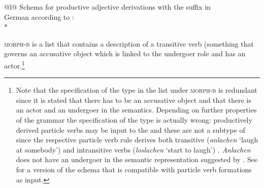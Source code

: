\documentclass[output=paper]{langsci/langscibook}
\begin{document}
\begin{tabular}[t]{@{}l@{}}
Schema for productive adjective derivations with the suffix  in\\ German according to
\citet[]{Riehemann98a}:\\*
\end{tabular}
\z
\textsc{morph-b} is a list that contains a description of a transitive verb (something that governs
an accusative object which is linked to the undergoer role  and has an actor.\footnote{
  Note that the specification of the type  in the list under \textsc{morph-b} is
  redundant since it is stated that there has to be an accusative object and that there is an actor
  and an undergoer in the semantics. Depending on further properties of the grammar the
  specification of the type is actually wrong: productively derived particle verbs may be input to
  the \bard and these are not a subtype of  since the respective particle verb rule
  derives both transitive (\emph{anlachen} `laugh at somebody')  and intransitive verbs
  (\emph{loslachen} `start to laugh') \citep[]{Mueller2003a}. \emph{Anlachen} does not have an
  undergoer in the semantic representation suggested by \citet{Stiebels96a}. See
  \citet[]{Mueller2003a} for a version of the \bard schema that is compatible with particle verb
  formations as input.
}
\end{document}
